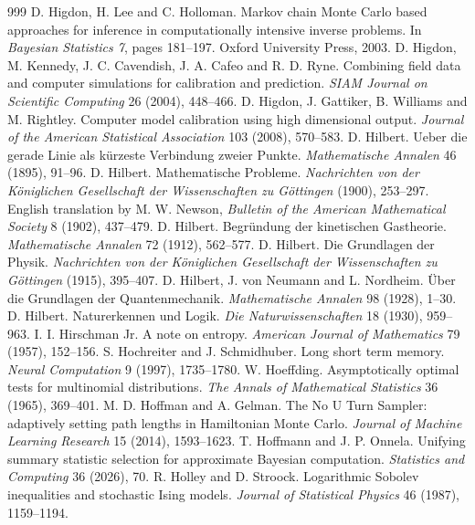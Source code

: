 \begin{thebibliography}{999}
 D. Higdon, H. Lee and C. Holloman. Markov chain Monte Carlo based approaches for inference in computationally intensive inverse problems. In \emph{Bayesian Statistics 7}, pages 181--197. Oxford University Press, 2003.
 D. Higdon, M. Kennedy, J. C. Cavendish, J. A. Cafeo and R. D. Ryne. Combining field data and computer simulations for calibration and prediction. \emph{SIAM Journal on Scientific Computing} 26 (2004), 448--466.
 D. Higdon, J. Gattiker, B. Williams and M. Rightley. Computer model calibration using high dimensional output. \emph{Journal of the American Statistical Association} 103 (2008), 570--583.
 D. Hilbert. Ueber die gerade Linie als k\"urzeste Verbindung zweier Punkte. \emph{Mathematische Annalen} 46 (1895), 91--96.
 D. Hilbert. Mathematische Probleme. \emph{Nachrichten von der K\"oniglichen Gesellschaft der Wissenschaften zu G\"ottingen} (1900), 253--297. English translation by M. W. Newson, \emph{Bulletin of the American Mathematical Society} 8 (1902), 437--479.
 D. Hilbert. Begr\"undung der kinetischen Gastheorie. \emph{Mathematische Annalen} 72 (1912), 562--577.
 D. Hilbert. Die Grundlagen der Physik. \emph{Nachrichten von der K\"oniglichen Gesellschaft der Wissenschaften zu G\"ottingen} (1915), 395--407.
 D. Hilbert, J. von Neumann and L. Nordheim. \"Uber die Grundlagen der Quantenmechanik. \emph{Mathematische Annalen} 98 (1928), 1--30.
 D. Hilbert. Naturerkennen und Logik. \emph{Die Naturwissenschaften} 18 (1930), 959--963.
 I. I. Hirschman Jr. A note on entropy. \emph{American Journal of Mathematics} 79 (1957), 152--156.
 S. Hochreiter and J. Schmidhuber. Long short term memory. \emph{Neural Computation} 9 (1997), 1735--1780.
 W. Hoeffding. Asymptotically optimal tests for multinomial distributions. \emph{The Annals of Mathematical Statistics} 36 (1965), 369--401.
 M. D. Hoffman and A. Gelman. The No U Turn Sampler: adaptively setting path lengths in Hamiltonian Monte Carlo. \emph{Journal of Machine Learning Research} 15 (2014), 1593--1623.
 T. Hoffmann and J. P. Onnela. Unifying summary statistic selection for approximate Bayesian computation. \emph{Statistics and Computing} 36 (2026), 70.
 R. Holley and D. Stroock. Logarithmic Sobolev inequalities and stochastic Ising models. \emph{Journal of Statistical Physics} 46 (1987), 1159--1194.

\end{thebibliography}
